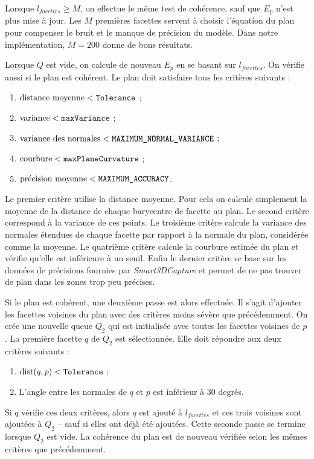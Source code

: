 ﻿\documentclass[12pt, twoside]{article}
\begin{document}
Lorsque $l_{facettes} \geq M$, on effectue le même test de cohérence, sauf que $E_p$ n'est plus mise à jour. Les $M$ premières facettes servent à choisir l'équation du plan pour compenser le bruit et le manque de précision du modèle. Dans notre implémentation, $M = 200$ donne de bons résultats.

Lorsque $Q$ est vide, on calcule de nouveau $E_p$ en se basant sur $l_{facettes}$. On vérifie aussi si le plan est cohérent. Le plan doit satisfaire tous les critères suivants :
\begin{enumerate}
  \item $\text{distance moyenne} < \text{\texttt{Tolerance}}$ ;
  \item $\text{variance} < \text{\texttt{maxVariance}}$ ;
  \item $\text{variance des normales} < \text{\texttt{MAXIMUM\_NORMAL\_VARIANCE}}$ ;
  \item $\text{courbure} < \text{\texttt{maxPlaneCurvature}}$ ;
  \item $\text{précision moyenne} < \text{\texttt{MAXIMUM\_ACCURACY}}$.
\end{enumerate}
Le premier critère utilise la distance moyenne. Pour cela on calcule simplement la moyenne de la distance de chaque barycentre de facette au plan. Le second critère correspond à la variance de ces points. Le troisième critère calcule la variance des normales étendues de chaque facette par rapport à la normale du plan, considérée comme la moyenne. Le quatrième critère calcule la courbure estimée du plan et vérifie qu'elle est inférieure à un seuil. Enfin le dernier critère se base sur les données de précisions fournies par \textit{Smart3DCapture} et permet de ne pas trouver de plan dans les zones trop peu précises.

Si le plan est cohérent, une deuxième passe est alors effectuée. Il s'agit d'ajouter les facettes voisines du plan avec des critères moins sévère que précédemment. On crée une nouvelle queue $Q_2$ qui est initialisée avec toutes les facettes voisines de $p$. La première facette $q$ de $Q_2$ est sélectionnée. Elle doit répondre aux deux critères suivants :
\begin{enumerate}
  \item $\text{dist}(q, p) < \text{\texttt{Tolerance}}$ ;
  \item L'angle entre les normales de $q$ et $p$ est inférieur à 30 degrés.
\end{enumerate}
Si $q$ vérifie ces deux critères, alors $q$ est ajouté à $l_{facettes}$ et ces trois voisines sont ajoutées à $Q_2$ -- sauf si elles ont déjà été ajoutées. Cette seconde passe se termine lorsque $Q_2$ est vide. La cohérence du plan est de nouveau vérifiée selon les mêmes critères que précédemment.
\end{document}
